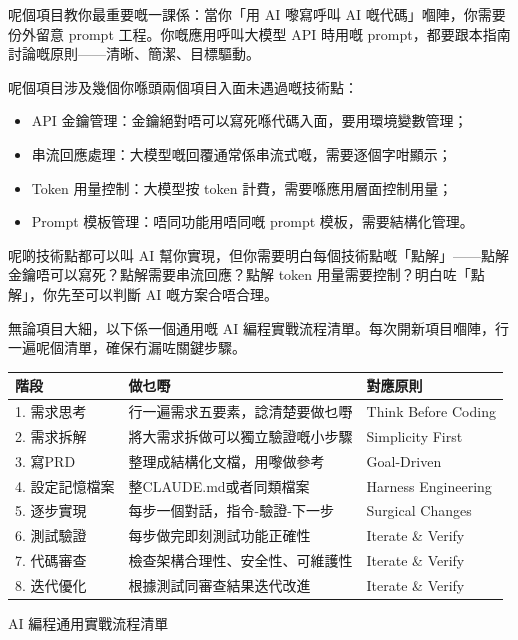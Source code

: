 呢個項目教你最重要嘅一課係：當你「用 AI 嚟寫呼叫 AI 嘅代碼」嗰陣，你需要份外留意 prompt 工程。你嘅應用呼叫大模型 API 時用嘅 prompt，都要跟本指南討論嘅原則——清晰、簡潔、目標驅動。


呢個項目涉及幾個你喺頭兩個項目入面未遇過嘅技術點：

\begin{itemize}
  \item API 金鑰管理：金鑰絕對唔可以寫死喺代碼入面，要用環境變數管理；
  \item 串流回應處理：大模型嘅回覆通常係串流式嘅，需要逐個字咁顯示；
  \item Token 用量控制：大模型按 token 計費，需要喺應用層面控制用量；
  \item Prompt 模板管理：唔同功能用唔同嘅 prompt 模板，需要結構化管理。
\end{itemize}

呢啲技術點都可以叫 AI 幫你實現，但你需要明白每個技術點嘅「點解」——點解金鑰唔可以寫死？點解需要串流回應？點解 token 用量需要控制？明白咗「點解」，你先至可以判斷 AI 嘅方案合唔合理。


無論項目大細，以下係一個通用嘅 AI 編程實戰流程清單。每次開新項目嗰陣，行一遍呢個清單，確保冇漏咗關鍵步驟。

\begin{center}
\begin{tabularx}{\linewidth}{|X|X|X|}
\hline
\textbf{階段} & \textbf{做乜嘢} & \textbf{對應原則} \tabularnewline
\hline
1. 需求思考 & 行一遍需求五要素，諗清楚要做乜嘢 & Think Before Coding \tabularnewline
2. 需求拆解 & 將大需求拆做可以獨立驗證嘅小步驟 & Simplicity First \tabularnewline
3. 寫PRD & 整理成結構化文檔，用嚟做參考 & Goal-Driven \tabularnewline
4. 設定記憶檔案 & 整CLAUDE.md或者同類檔案 & Harness Engineering \tabularnewline
5. 逐步實現 & 每步一個對話，指令-驗證-下一步 & Surgical Changes \tabularnewline
6. 測試驗證 & 每步做完即刻測試功能正確性 & Iterate \& Verify \tabularnewline
7. 代碼審查 & 檢查架構合理性、安全性、可維護性 & Iterate \& Verify \tabularnewline
8. 迭代優化 & 根據測試同審查結果迭代改進 & Iterate \& Verify \tabularnewline
\hline
\end{tabularx}
\end{center}

\begin{center}\small\color{gray}AI 編程通用實戰流程清單\end{center}

